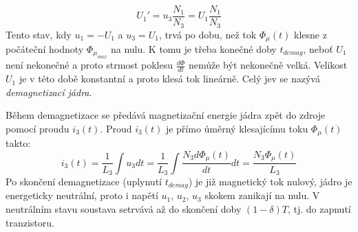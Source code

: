     \begin{equation}\label{ENZ:eq_forward_u1_demag}
     U_1'=u_3\frac{N_1}{N_3} = U_1\frac{N_1}{N_3}
    \end{equation}
    Tento stav, kdy  $u_1 = -U_1$ a  $u_3 = U_1$, trvá po dobu, než tok $\Phi_\mu(t)$ klesne z 
    počáteční hodnoty $\Phi_{\mu_{max}}$ na nulu. K tomu je třeba konečné doby $t_{demag}$, neboť 
    $U_1$ není nekonečné a proto strmost poklesu $\frac{d\Phi}{dt}$ nemůže být nekonečně velká. 
    Velikost $U_1$ je v této době konstantní a proto klesá tok lineárně. Celý jev se nazývá 
    \emph{demagnetizací jádra}.
    
    Během demagnetizace se předává magnetizační energie jádra zpět do zdroje pomocí proudu 
    $i_3(t)$. Proud $i_3(t)$ je přímo úměrný klesajícímu toku $\Phi_\mu(t)$ takto:
    \begin{equation}\label{ENZ:eq_imag_phi_forward}
     i_3(t) = \frac{1}{L_3}\int{u_3}dt = \frac{1}{L_3}\int{\frac{N_3d\Phi_\mu(t)}{dt}}dt =
     \frac{N_3\Phi_\mu(t)}{L_3}
    \end{equation}
    Po skončení demagnetizace (uplynutí $t_{demag}$) je již magnetický tok nulový, jádro je 
    energeticky neutrální, proto i napětí $u_1$, $u_2$, $u_3$ skokem zanikají na nulu. V 
    neutrálním stavu soustava setrvává až do skončení doby $(1-\delta)T$, tj. do zapnutí 
    tranzistoru.
    
